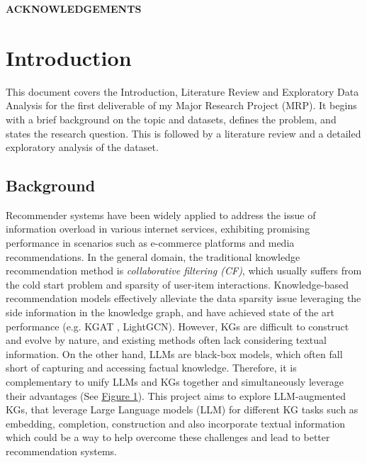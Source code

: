 \documentclass[a4paper]{article}
\begin{document}
\newpage
\thispagestyle{fancy}
\renewcommand{\headrulewidth}{0pt}
\cfoot{\thepage}
\centering
{\bfseries ACKNOWLEDGEMENTS}

\justifying
{}

\tableofcontents
\listoffigures
\listoftables
\newpage

\pagestyle{fancy}
\fancyhf{}
\renewcommand{\headrulewidth}{0pt}
\fancyfoot[R]{\thepage}
\renewcommand{\footrulewidth}{0pt}



\chapter{Introduction}

This document covers the Introduction, Literature Review and Exploratory Data Analysis for
the first deliverable of my Major Research Project (MRP). It begins with a brief background on
the topic and datasets, defines the problem, and states the research question. This is followed
by a literature review and a detailed exploratory analysis of the dataset.

\section{Background}
Recommender systems have been widely applied to address the issue of information overload in various internet services, exhibiting promising performance in scenarios such as e-commerce platforms and media recommendations. 
In the general domain, the traditional knowledge recommendation method is  \textit{collaborative filtering (CF)}, which usually suffers from the cold start problem and sparsity of user-item interactions. 
Knowledge-based recommendation models effectively alleviate the data sparsity issue leveraging the side information in the knowledge graph, and have achieved state of the art performance\cite{guo2020survey} (e.g. KGAT\cite{wang2019kgat} , LightGCN\cite{he2020lightgcn}).
However, KGs are difficult to construct and evolve by nature, and existing methods often lack considering textual information. On the other hand, LLMs are black-box models, which often fall short of capturing and accessing factual knowledge.
Therefore, it is complementary to unify LLMs and KGs together and simultaneously leverage their advantages (See \hyperref[fig:llm_vs_kg]{Figure 1}).
This project aims to explore LLM-augmented KGs, that leverage Large Language models (LLM) for different KG tasks such as embedding, completion, construction and also incorporate textual information which could be a way to help overcome these challenges and lead to better recommendation systems.
\end{document}
